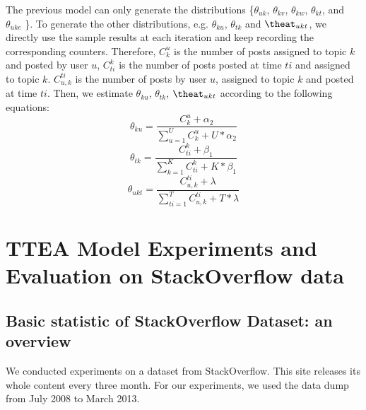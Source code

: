 {{{{{{{The previous model can only generate the distributions \{$\theta_{uk}$, $\theta_{kv}$, $\theta_{kw}$, $\theta_{kt}$, and $\theta_{uke}$ \}. To generate the other distributions, e.g. $\theta_{ku}$, $\theta_{tk}$ and $\theat_{ukt}$, we directly use the sample results at each iteration and keep recording the corresponding counters. Therefore, $C_k^u$ is the number of posts assigned to topic $k$ and posted by user $u$, $C_{ti}^k$ is the number of posts posted at time $ti$ and assigned to topic $k$. $C_{u,k}^{ti}$ is the number of posts by user $u$, assigned to topic $k$ and posted at time $ti$.
Then, we estimate $\theta_{ku}$, $\theta_{tk}$, $\theat_{ukt}$ according to the following equations:
\begin{equation}%
\theta_{ku}=\frac{ C_k^u + \alpha_2 }{ \sum_{u=1}^U C_k^u+ U* \alpha_2} 
\end{equation}
\begin{equation}%
\theta_{tk}=\frac{ C_{ti}^{k} + \beta_1 }{ \sum_{k=1}^{K} C_{ti}^{k}+ K* \beta_1}
\end{equation}
\begin{equation}%
\theta_{ukt}=\frac{ C_{u,k}^{ti} + \lambda }{ \sum_{ti=1}^T C_{u,k}^{ti}+ T* \lambda} 
\end{equation}



\section{TTEA Model Experiments and Evaluation on StackOverflow data}\label{sec:TTEAexperiment}

\subsection{Basic statistic of StackOverflow Dataset: an overview}


We conducted experiments on a dataset from StackOverflow. This site releases its whole content every three month. For our experiments, we used the data dump from July 2008 to March 2013. 

}}}}}}}
